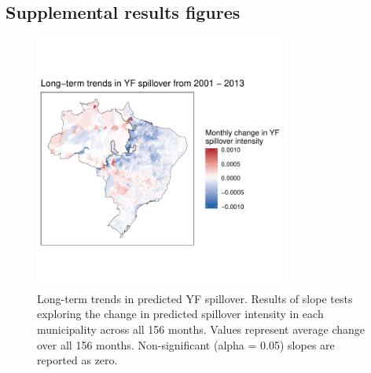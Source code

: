 \documentclass{article}
\begin{document}
\subsection{Supplemental results figures}

\begin{figure}[h]
\centering
\includegraphics[width=0.75\textwidth]{trendsAcrossSpace_156months}
\caption{Long-term trends in predicted YF spillover. Results of slope tests exploring the change in predicted spillover intensity in each municipality across all 156 months. Values represent average change over all 156 months. Non-significant (alpha = 0.05) slopes are reported as zero.}
\label{trends156}
\end{figure}

\newpage
\end{document}

